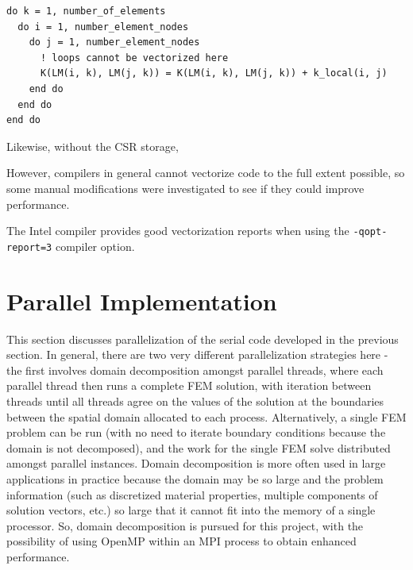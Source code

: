 \documentclass[10pt]{article}
\begin{document}
\begin{lstlisting}
do k = 1, number_of_elements
  do i = 1, number_element_nodes
    do j = 1, number_element_nodes
      ! loops cannot be vectorized here
      K(LM(i, k), LM(j, k)) = K(LM(i, k), LM(j, k)) + k_local(i, j)
    end do
  end do
end do
\end{lstlisting}

Likewise, without the CSR storage, 



However, compilers in general cannot vectorize code to the full extent possible, so some manual modifications were investigated to see if they could improve performance. 





The Intel compiler provides good vectorization reports when using the {\tt -qopt-report=3} compiler option. 

\section{Parallel Implementation}
This section discusses parallelization of the serial code developed in the previous section. In general, there are two very different parallelization strategies here - the first involves domain decomposition amongst parallel threads, where each parallel thread then runs a complete FEM solution, with iteration between threads until all threads agree on the values of the solution at the boundaries between the spatial domain allocated to each process. Alternatively, a single FEM problem can be run (with no need to iterate boundary conditions because the domain is not decomposed), and the work for the single FEM solve distributed amongst parallel instances. Domain decomposition is more often used in large applications in practice because the domain may be so large and the problem information (such as discretized material properties, multiple components of solution vectors, etc.) so large that it cannot fit into the memory of a single processor. So, domain decomposition is pursued for this project, with the possibility of using OpenMP within an MPI process to obtain enhanced performance.
\end{document}
